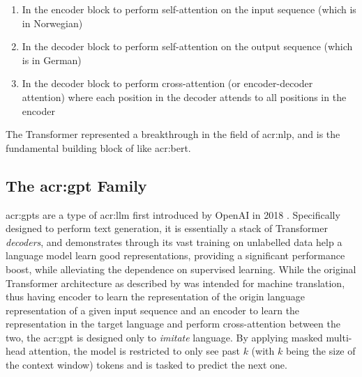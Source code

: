 \begin{enumerate}
    \item In the encoder block to perform self-attention on the input sequence (which is in Norwegian)
    \item In the decoder block to perform self-attention on the output sequence (which is in German)
    \item In the decoder block to perform cross-attention (or encoder-decoder attention) where each position in the decoder attends to all positions in the encoder
\end{enumerate}

The Transformer represented a breakthrough in the field of \gls{acr:nlp}, and is the fundamental building block of  like \acrshort{acr:bert}.

\subsection[The GPT Family]{The \acrshort{acr:gpt} Family}\label{subsec:gpt}

\glspl{acr:gpt} are a type of \gls{acr:llm} first introduced by OpenAI in 2018 \citep{radfordImprovingLanguageUnderstanding2018}. Specifically designed to perform text generation, it is essentially a stack of Transformer \textit{decoders}, and demonstrates through its vast training on unlabelled data help a language model learn good representations, providing a significant performance boost, while alleviating the dependence on supervised learning. While the original Transformer architecture as described by \cite{vaswaniAttentionAllYou2017} was intended for machine translation, thus having encoder to learn the representation of the origin language representation of a given input sequence and an encoder to learn the representation in the target language and perform cross-attention between the two, the \acrshort{acr:gpt} is designed only to \textit{imitate} language. By applying masked multi-head attention, the model is restricted to only see past $k$ (with $k$ being the size of the context window) tokens and is tasked to predict the next one.

